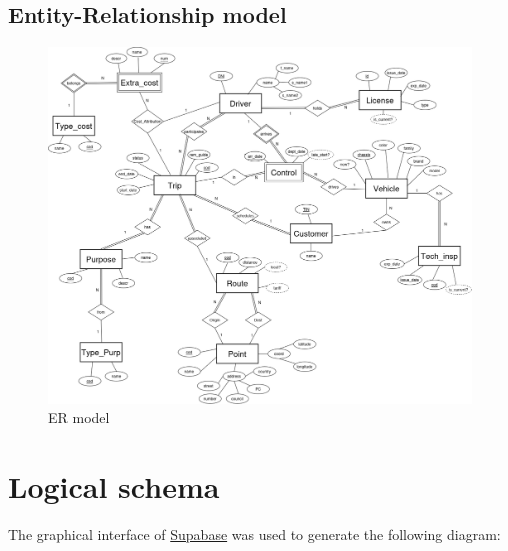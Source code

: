 \documentclass[11pt, a4paper]{article}
\begin{document}
\begin{landscape}

\section{Entity-Relationship model}

\begin{figure}[h!]
    \centering
    \includegraphics[width=1.03\textwidth]{img/er_model.png}
    \caption{ER model}
    \label{er_model}
\end{figure}
    

\end{landscape}


\newpage

\restoregeometry

\section{Logical schema}

The graphical interface of \href{https://www.supabase.com}{Supabase} was used to generate the following diagram:
\end{document}
